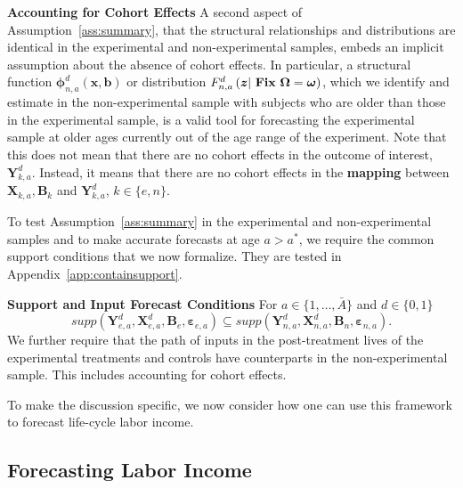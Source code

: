 \begin{remark} \label{remark:cohort} \textbf{Accounting for Cohort Effects}
A second aspect of Assumption~\ref{ass:summary}, that the structural relationships and distributions are identical in the experimental and non-experimental samples, embeds an implicit assumption about the absence of cohort effects. In particular, a structural function $\bm{\phi}_{n,a}^d \left( \bm{x}, \bm{b} \right)$ or distribution $F^d_{n,a} \left(\bm{z} | \text{ \text{\textbf{Fix}} } \bm{\Omega} = \bm{\omega}\right)$, which we identify and estimate in the non-experimental sample with subjects who are older than those in the experimental sample, is a valid tool for forecasting the experimental sample at older ages currently out of the age range of the experiment. Note that this does not mean that there are no cohort effects in the outcome of interest, $\bm{Y}^d_{k,a}$. Instead, it means that there are no cohort effects in the \textbf{mapping} between $\bm{X}_{k,a}, \bm{B}_k$ and $\bm{Y}_{k,a}^d$, $k \in \{e,n\}$.
\end{remark}

\doublespacing
To test Assumption~\ref{ass:summary} in the experimental and non-experimental samples and to make accurate forecasts at age $a > a^*$, we require the common support conditions that we now formalize. They are tested in Appendix~\ref{app:containsupport}.

\onehalfspacing
\begin{assumption} \label{ass:contain} \textbf{Support and Input Forecast Conditions}
For $a \in \{ 1, \ldots, \bar{A} \}$ and $d \in \{0,1\}$
\begin{equation}
supp( \bm{Y}_{e,a}^d, \bm{X}^d_{e,a}, \bm{B}_e, \bm{\varepsilon}_{e,a} ) \subseteq supp( \bm{Y}_{n,a}^d, \bm{X}^d_{n,a}, \bm{B}_n, \bm{\varepsilon}_{n,a} ).
\end{equation}
We further require that the path of inputs in the post-treatment lives of the experimental treatments and controls have counterparts in the non-experimental sample. This includes accounting for cohort effects.
\end{assumption}

\doublespacing
To make the discussion specific, we now consider how one can use this framework to forecast life-cycle labor income.

\subsection{Forecasting Labor Income} \label{sec:forecasting}

